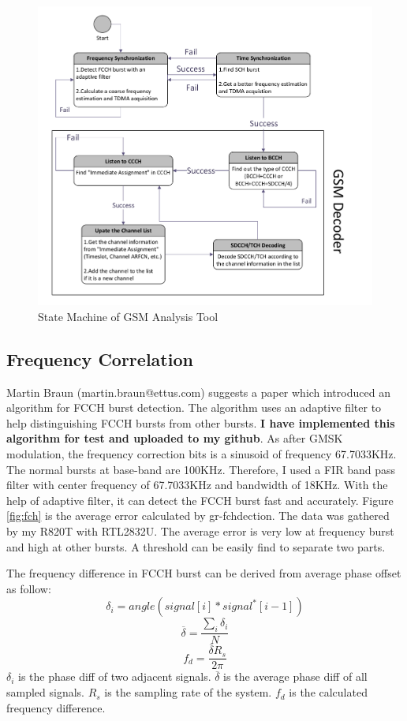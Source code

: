 \documentclass[a4paper,12pt,oneside]{article}
\begin{document}
\begin{figure}[!h]
\centering\includegraphics[width=6.4in]{figure/state_machine.pdf}
\caption{State Machine of GSM Analysis Tool \label{fig:state}}
\end{figure}


\subsection{Frequency Correlation}

Martin Braun (martin.braun@ettus.com) suggests a paper \cite{1404796} which introduced an algorithm for FCCH burst detection. The algorithm uses an adaptive filter to help distinguishing FCCH bursts from other bursts. \textbf{I have implemented this algorithm for test and uploaded to my github\cite{gitfch}}.
As after GMSK modulation, the frequency correction bits is a sinusoid of frequency 67.7033KHz. The normal bursts at base-band are 100KHz.
Therefore, I used a FIR band pass filter with center frequency of 67.7033KHz and bandwidth of 18KHz. With the help of adaptive filter, it can detect
the FCCH burst fast and accurately. Figure \ref{fig:fch} is the average error calculated by gr-fchdection. The data was gathered by my R820T with RTL2832U. The average error is very low
at frequency burst and high at other bursts. A threshold can be easily find to separate two parts. 

The frequency difference in FCCH burst can be derived from average phase offset as follow:
\[
\delta_i = angle(signal[i]*signal^*[i-1])
\]
\[
\overline{\delta} = \frac{\sum_i {\delta_i}}{N}
\]
\[
f_d = \frac{\overline{\delta} R_s }{2\pi}
\]
$\delta_i$ is the phase diff of two adjacent signals. $\overline{\delta}$ is the average phase diff of all sampled signals.
$R_s$ is the sampling rate of the system. $f_d$ is the calculated frequency difference.
\end{document}
